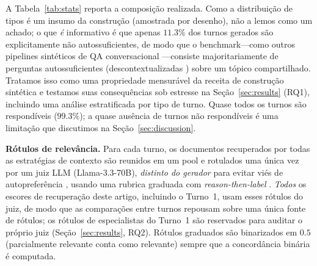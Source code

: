 \documentclass[conference]{IEEEtran}
\begin{document}
A Tabela~\ref{tab:stats} reporta a composição realizada. Como a distribuição de
tipos é um insumo da construção (amostrada por desenho), não a lemos como um
achado; o que \emph{é} informativo é que apenas $11.3\%$ dos turnos gerados são
explicitamente não autossuficientes, de modo que o benchmark---como outros
pipelines sintéticos de QA conversacional \cite{Vlachos2025Synthetic}---consiste
majoritariamente de perguntas autossuficientes (descontextualizadas
\cite{Choi2021Decontextualization}) sobre um tópico compartilhado. Tratamos
isso como uma propriedade mensurável da receita de construção sintética e
testamos suas consequências sob estresse na Seção~\ref{sec:results} (RQ1),
incluindo uma análise estratificada por tipo de turno. Quase todos os turnos são
respondíveis ($99.3\%$); a quase ausência de turnos não respondíveis é uma
limitação que discutimos na Seção~\ref{sec:discussion}.

\textbf{Rótulos de relevância.} Para cada turno, os documentos recuperados por
todas as estratégias de contexto são reunidos em um pool e rotulados uma única
vez por um juiz LLM (Llama-3.3-70B), \emph{distinto do gerador} para evitar
viés de autopreferência \cite{Panickssery2024SelfPref}, usando uma rubrica
graduada com \emph{reason-then-label} \cite{Liu2023GEval}. \emph{Todos} os
escores de recuperação deste artigo, incluindo o Turno~1, usam esses rótulos do
juiz, de modo que as comparações entre turnos repousam sobre uma única fonte de
rótulos; os rótulos de especialistas do Turno~1 são reservados para auditar o
próprio juiz (Seção~\ref{sec:results}, RQ2). Rótulos graduados são binarizados
em $0.5$ (parcialmente relevante conta como relevante) sempre que a
concordância binária é computada.
\end{document}
